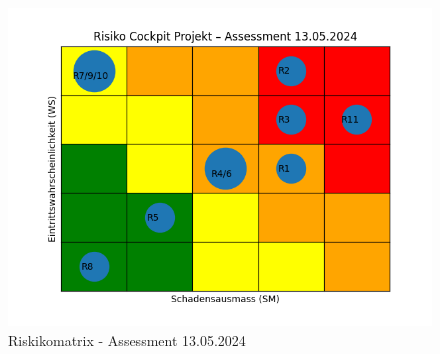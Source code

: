 \begin{flushleft}
    \clearpage
    \recalctypearea
    \begin{figure}[H]
        \centering
        \includegraphics[width=0.75\linewidth]{source/riskmatrix/project-assessment-13-05-2024}
        \caption{Riskikomatrix - Assessment 13.05.2024}
        \label{fig:project-assessment-13-05-2024}
    \end{figure}
\end{flushleft}